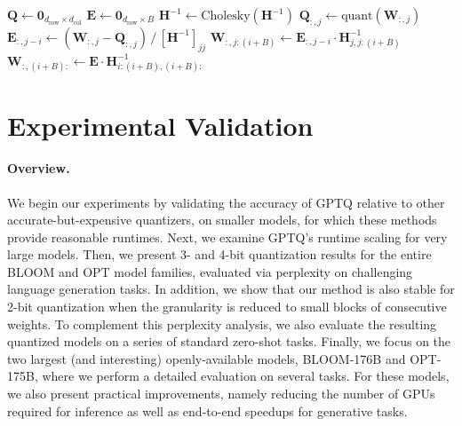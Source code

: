 \begin{algorithm}[H]
    \centering
    \caption{Quantize $\mathbf{W}$ given inverse Hessian $\mathbf{H}^{-1} = (2 \mathbf{X} \mathbf{X}^\top + \lambda \mathbf{I})^{-1}$ and blocksize $B$.}
    \small
    \label{alg:trueobs-row}
    \begin{algorithmic}
        \STATE $\mathbf{Q} \gets \mathbf{0}_{d_\text{row} \times d_\text{col}}$ \quad {}
        \STATE $\mathbf{E} \gets \mathbf{0}_{d_\text{row} \times B}$ \quad {}
        \STATE $\mathbf{H}^{-1} \gets \text{Cholesky}
        (\mathbf{H}^{-1})$ 
                \STATE $\mathbf{Q}_{:, j} \gets \text{quant}(\mathbf{W}_{:, j})$ \quad {}
                \STATE $\mathbf{E}_{:, j - i} \gets (\mathbf{W}_{:, j} - \mathbf{Q}_{:, j}) \, / \, [\mathbf{H}^{-1}]_{jj}$ 
                \STATE $\mathbf{W}_{:, j:(i + B)} \gets \mathbf{E}_{:, j - i} \cdot \mathbf{H}^{-1}_{j, j:(i + B)}$ 
            \ENDFOR
            \STATE $\mathbf{W}_{:, (i + B):} \gets \mathbf{E} \cdot \mathbf{H}^{-1}_{i:(i + B), (i + B):}$ 
        \ENDFOR
    \end{algorithmic}
\end{algorithm}

\section{Experimental Validation}
\label{sec:experiments}

\paragraph{Overview.} We begin our experiments by validating the accuracy of GPTQ relative to other accurate-but-expensive quantizers,  on smaller models, for which these methods provide reasonable runtimes. Next, we examine GPTQ's runtime scaling for very large models. Then, we present 3- and 4-bit quantization results for the entire BLOOM and OPT model families, evaluated via perplexity on challenging language generation tasks. In addition, we show that our method is also stable for 2-bit quantization when the granularity is reduced to small blocks of consecutive weights. To complement this perplexity analysis, we also evaluate the resulting quantized models on a series of standard zero-shot tasks. Finally, we focus on the two largest (and interesting) openly-available models, BLOOM-176B and OPT-175B, where we perform a detailed evaluation on several tasks. For these models, we also present practical improvements, namely reducing the number of GPUs required for inference as well as end-to-end speedups for generative tasks.


